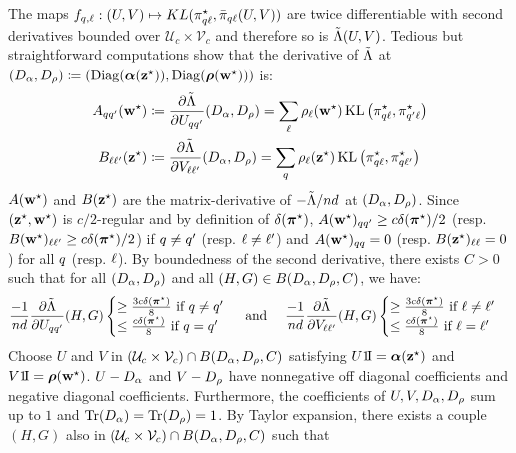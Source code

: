 The maps $f_{q,\ell}: (U, V) \mapsto KL(\pi^\star_{q\ell}, \bar{\pi}_{q\ell}(U, V))$ are twice differentiable with second derivatives bounded over $\mathcal{U}_c \times\mathcal{V}_c$ and therefore so is $\tilde{\Lambda}(U, V)$. Tedious but straightforward computations show that the derivative of $\tilde{\Lambda}$ at $(D_{\alpha}, D_{\rho}) \coloneqq (\operatorname{Diag}(\boldsymbol{\alpha}(\mathbf{z}^\star)), \operatorname{Diag}(\boldsymbol{\rho}(\mathbf{w}^\star)))$ is: 
\begin{align*}
A_{\kk\kp}(\bws) & \coloneqq \frac{\partial \Lambtilde}{\partial U_{\kk\kp}}(D_{\pii}, D_{\rhoo}) = \sum_{\el} \rhol(\bws) \KL\left(\alskl, \als_{\kp\el} \right) \\
B_{\el\lp}(\bzs) & \coloneqq \frac{\partial \Lambtilde}{\partial V_{\el\lp}}(D_{\pii}, D_{\rhoo}) = \sum_{\kk} \rhol(\bzs) \KL\left(\alskl, \als_{\kk\lp} \right)
\end{align*}
$A(\mathbf{w}^\star)$ and $B(\mathbf{z}^\star)$ are the matrix-derivative of $-\tilde{\Lambda}/nd$ at $(D_{\alpha}, D_{\rho})$. Since $(\mathbf{z}^\star, \mathbf{w}^\star)$ is $c/2$-regular and by definition of $\delta(\boldsymbol{\pi}^\star)$, $A(\mathbf{w}^\star)_{qq'} \geq c\delta(\boldsymbol{\pi}^\star)/2$ (resp. $B(\mathbf{w}^\star)_{\ell\ell'} \geq c\delta(\boldsymbol{\pi}^\star)/2$) if $q \neq q'$ (resp. $\ell \neq \ell'$) and $A(\mathbf{w}^\star)_{qq} = 0$ (resp. $B(\mathbf{z}^\star)_{\ell\ell} = 0$) for all $q$ (resp. $\ell$). By boundedness of the second derivative, there exists $C > 0$ such that for all $(D_{\alpha}, D_{\rho})$ and all $(H, G) \in B(D_{\alpha}, D_{\rho}, C)$, we have:
\begin{align*}
\frac{-1}{nd} \frac{\partial \Lambtilde}{\partial U_{\kk\kp}}(H, G) \begin{cases} \geq \frac{3c\delta(\bals)}{8} \text { if } \kk \neq \kp \\ \leq \frac{c\delta(\bals)}{8} \text { if } \kk = \kp \end{cases} \text{ and } \quad 
\frac{-1}{nd} \frac{\partial \Lambtilde}{\partial V_{\el\lp}}(H, G) \begin{cases} \geq \frac{3c\delta(\bals)}{8} \text { if } \el \neq \lp \\ \leq \frac{c\delta(\bals)}{8} \text { if } \el = \lp \end{cases}
\end{align*}
Choose $U$ and $V$ in $(\mathcal{U}_{c} \times \mathcal{V}_{c}) \cap B(D_{\alpha}, D_{\rho}, C)$ satisfying $U\un = \bpi(\bzs)$ and $V\un = \brho(\bws)$. $U - D_{\alpha}$ and $V - D_{\rho}$ have nonnegative off diagonal coefficients and negative diagonal coefficients. Furthermore, the coefficients of $U, V, D_{\alpha}, D_{\rho}$ sum up to $1$ and $\operatorname{Tr}(D_{\alpha}) = \operatorname{Tr}(D_{\rho}) = 1$. By Taylor expansion, there exists a couple $(H, G)$ also in $(\mathcal{U}_c \times \mathcal{V}_c) \cap B(D_{\alpha}, D_{\rho}, C)$ such that
